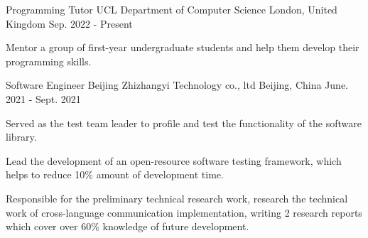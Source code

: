 
\begin{cventries}

  \cventry
  {Programming Tutor} %
  {UCL Department of Computer Science } %
  {London, United Kingdom} %
  {Sep. 2022 - Present} %
  {
    \begin{cvitems}
      \item {Mentor a group of first-year undergraduate students and help them develop their programming skills.}
    \end{cvitems}
  }

  \cventry
  {Software Engineer} %
  {Beijing Zhizhangyi Technology co., ltd} %
  {Beijing, China} %
  {June. 2021 - Sept. 2021} %
  {
    \begin{cvitems}
      \item {Served as the test team leader to profile and test the functionality of the software library.}
      \item {Lead the development of an open-resource software testing framework, which helps to reduce 10\% amount of development time.}
      \item {Responsible for the preliminary technical research work, research the technical work of cross-language communication implementation, writing 2 research reports which cover over 60\% knowledge of future development.}
    \end{cvitems}
  }

\end{cventries}
